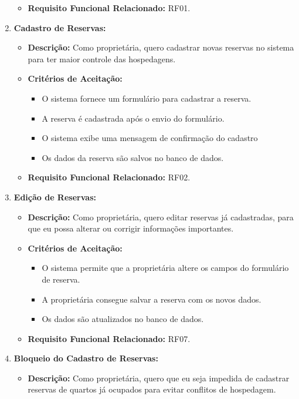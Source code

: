 \documentclass[
	12pt,				%
	openany,			%
	oneside,			%
	a4paper,			%
	english,			%
	french,				%
	spanish,			%
	brazil				%
	]{abntex2}
\begin{document}
\begin{enumerate}[label=\textbf{\arabic*.}]
\begin{itemize}
\begin{itemize}
		\end{itemize}
		\item \textbf{Requisito Funcional Relacionado:} RF01.
	\end{itemize} 
	\item \textbf{Cadastro de Reservas:}
	\begin{itemize}
		\item \textbf{Descrição:} Como proprietária, quero cadastrar novas reservas no sistema para ter maior controle das hospedagens.
		\item \textbf{Critérios de Aceitação:}
		\begin{itemize}
			\item O sistema fornece um formulário para cadastrar a reserva.
			\item A reserva é cadastrada após o envio do formulário.
			\item O sistema exibe uma mensagem de confirmação do cadastro
			\item Os dados da reserva são salvos no banco de dados. 
		\end{itemize}
		\item \textbf{Requisito Funcional Relacionado:} RF02.
	\end{itemize} 
	\item \textbf{Edição de Reservas:}
	\begin{itemize}
		\item \textbf{Descrição:} Como proprietária,  quero editar reservas já cadastradas,  para que eu possa alterar ou corrigir informações importantes.
		\item \textbf{Critérios de Aceitação:}
		\begin{itemize}
			\item O sistema permite que a proprietária altere os campos do formulário de reserva.
			\item A proprietária consegue salvar a reserva com os novos dados.
			\item Os dados são atualizados no banco de dados.
		\end{itemize}
		\item \textbf{Requisito Funcional Relacionado:} RF07.
	\end{itemize} 
	\item \textbf{Bloqueio do Cadastro de Reservas:}
	\begin{itemize}
		\item \textbf{Descrição:} Como proprietária, quero que eu seja impedida de cadastrar reservas de quartos já ocupados para evitar conflitos de hospedagem.

\end{itemize}
\end{enumerate}
\end{document}
